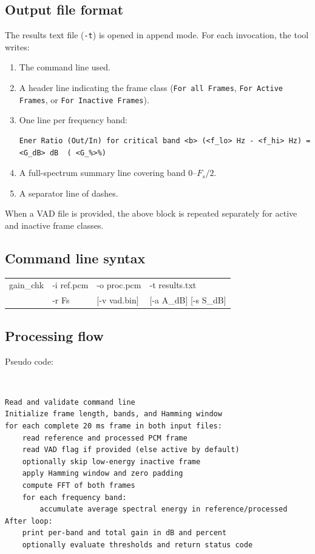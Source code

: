\subsection{Output file format}

The results text file (\texttt{-t}) is opened in append mode. For each
invocation, the tool writes:

\begin{enumerate}
\item The command line used.
\item A header line indicating the frame class (\texttt{For all Frames},
      \texttt{For Active Frames}, or \texttt{For Inactive Frames}).
\item One line per frequency band:
\begin{verbatim}
Ener Ratio (Out/In) for critical band <b> (<f_lo> Hz - <f_hi> Hz) = <G_dB> dB  ( <G_%>%)
\end{verbatim}
\item A full-spectrum summary line covering band $0$--$F_s/2$.
\item A separator line of dashes.
\end{enumerate}

\noindent When a VAD file is provided, the above block is repeated
separately for active and inactive frame classes.

\subsection{Command line syntax}

{\tt {\small
\begin{tabular}{llll}
gain\_chk & -i ref.pcm & -o proc.pcm & -t results.txt \\
          & -r Fs      & [-v vad.bin] & [-a A\_dB] [-s S\_dB] \\
\end{tabular}
}}

\subsection{Processing flow}

Pseudo code:
{\tt\small
\begin{verbatim}
Read and validate command line
Initialize frame length, bands, and Hamming window
for each complete 20 ms frame in both input files:
    read reference and processed PCM frame
    read VAD flag if provided (else active by default)
    optionally skip low-energy inactive frame
    apply Hamming window and zero padding
    compute FFT of both frames
    for each frequency band:
        accumulate average spectral energy in reference/processed
After loop:
    print per-band and total gain in dB and percent
    optionally evaluate thresholds and return status code
\end{verbatim}
}

